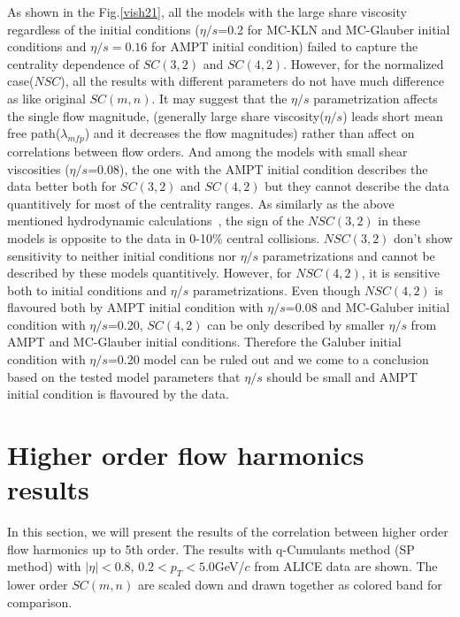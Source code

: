 As shown in the Fig.\ref{vish21},  all the models with the large share viscosity regardless of the initial conditions ($\eta/s$=0.2 for MC-KLN and MC-Glauber initial conditions and $\eta/s = 0.16$ for AMPT initial condition) failed to capture the centrality dependence of $SC(3,2)$ and $SC(4,2)$.  However, for the normalized case($NSC$), all the results with different parameters do not have much difference as like original $SC(m,n)$. It may suggest that the $\eta/s$ parametrization affects the single flow magnitude, (generally large share viscosity($\eta/s$) leads short mean free path($\lambda_{mfp}$) and it decreases the flow magnitudes) rather than affect on correlations between flow orders. 
And among the models with small shear viscosities ($\eta/s$=0.08), the one with the AMPT initial condition describes the data better both for $SC(3,2)$ and $SC(4,2)$ but they cannot describe the data quantitively for most of the centrality ranges.
As similarly as the above mentioned hydrodynamic calculations~\cite{Niemi:2015qia}, the sign of the $NSC(3,2)$ in these models is opposite to the data in 0-10\% central collisions. $NSC(3,2)$ don't show sensitivity to neither initial conditions nor $\eta/s$ parametrizations and cannot be described by these models quantitively.
However, for $NSC(4,2)$, it is sensitive both to initial conditions and $\eta/s$ parametrizations.
Even though $NSC(4,2)$ is flavoured both by AMPT initial condition with $\eta/s$=0.08 and MC-Galuber initial condition with $\eta/s$=0.20,
$SC(4,2)$ can be only described by smaller $\eta/s$ from AMPT and MC-Glauber initial conditions. Therefore the Galuber initial condition with $\eta/s$=0.20 model can be ruled out and we come to a conclusion based on the tested model parameters that $\eta/s$ should be small and AMPT initial condition is flavoured by the data.
  

\section{Higher order flow harmonics results}

In this section, we will present the results of the correlation between higher order flow harmonics up to 5th order. The results with q-Cumulants method (SP method) with $|\eta| < 0.8$, $0.2 < p_T < 5.0$GeV/$c$ from ALICE data are shown. The lower order $SC(m,n)$ are scaled down and drawn together as colored band for comparison.


